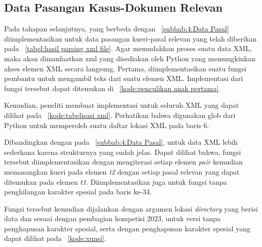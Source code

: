 \subsection{Data Pasangan Kasus-Dokumen Relevan}
\label{subbab:4:Data Pasangan Kasus-Dokumen Relevan}
Pada tahapan selanjutnya, \parsing{} yang berbeda  dengan \subbab{}~\ref{subbab:4:Data Pasal} diimplementasikan untuk data pasangan kueri-pasal relevan yang telah diberikan pada \gambar{}~\ref{tabel:hasil parsing xml file}. Agar memudahkan proses \parsing{} suatu data XML, maka akan dimanfaatkan \library{} xml yang disediakan oleh Python yang memungkinkan akses elemen XML secara langsung. Pertama, diimplementasikan suatu fungsi pembantu untuk mengambil teks dari suatu elemen XML. Implementasi dari fungsi tersebut dapat ditemukan di \kode{}~\ref{kode:penculikan anak pertama}.


Kemudian, peneliti membuat implementasi \parsing{} untuk seluruh XML \file{} yang dapat dilihat pada \kode{}~\ref{kode:tabelisasi xml}. Perhatikan bahwa digunakan \library{} glob dari Python untuk memperoleh suatu daftar lokasi \file{} XML pada baris 6.

Dibandingkan dengan \parsing{} pada \subbab{}~\ref{subbab:4:Data Pasal}, \parsing{} untuk data XML lebih sederhana karena strukturnya yang sudah jelas. Dapat dilihat bahwa, fungsi tersebut diimplementasikan dengan mengiterasi setiap elemen \textit{pair} kemudian memasangkan kueri pada elemen \textit{t2} dengan setiap pasal relevan yang dapat ditemukan pada elemen \textit{t1}. Diimplementasikan juga untuk fungsi tanpa penghilangan karakter spesial pada baris ke-34.

Fungsi tersebut kemudian dijalankan dengan argumen lokasi \textit{directory} yang berisi data \training{} dan \testing{} sesuai dengan pembagian \dataset{} kompetisi \COLIEE{} 2023, untuk versi tanpa penghapusan karakter spesial, serta dengan penghapusan karakter spesial yang dapat dilihat pada \kode{}~\ref{kode:xunsi}. 

